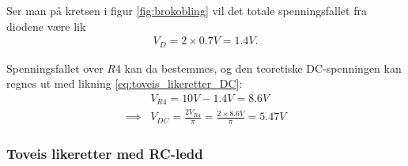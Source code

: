             Ser man på kretsen i figur \ref{fig:brokobling} vil det totale spenningsfallet fra diodene være lik
            \begin{align*}
                V_D = 2\times 0.7V = 1.4V.
            \end{align*}
            
            Spenningsfallet over $R4$ kan da bestemmes, og den teoretiske DC-spenningen kan regnes ut med likning \eqref{eq:toveis_likeretter_DC}:
            \begin{align*}
                &V_{R4} = 10V - 1.4V = 8.6V \\
                \implies &V_{DC} = \frac{2 V_{R4}}{\pi} = \frac{2\times 8.6V}{\pi} = 5.47V
            \end{align*}

        \subsubsection{Toveis likeretter med RC-ledd}
        

